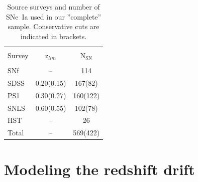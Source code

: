 \documentclass[]{aa} %
\newcommand{\mri}[1]{{\textcolor{red}{#1}}}
\newcommand{\nn}[1]{{\textcolor[rgb]{1, 0.27, 0}{#1}}}
\begin{document}
\begin{table}
    \centering
    \caption{\nn{Source surveys and number of SNe~Ia used in our ''complete''
    sample. Conservative cuts are indicated in brackets.}}
    \label{tab:sample}
    \begin{tabular}{l c c}
    \hline\hline\\[-0.8em]
        Survey & z$_{lim}$ & N$_{\mathrm{SN}}$ \\[0.15em]
        \hline\\[-0.8em]
        SNf & -- & 114\\[0.30em]
        SDSS & 0.20(0.15) & 167(82)\\[0.30em]
        PS1 & 0.30(0.27) & 160(122)\\[0.30em]        
        SNLS & 0.60(0.55) & 102(78)\\[0.30em]
        HST & -- & 26\\[0.30em]
        Total & -- & 569(422)\\[0.30em]
        \hline
    \end{tabular}
\end{table}







\section{Modeling the redshift drift}
\label{sec:modeling}
\end{document}
